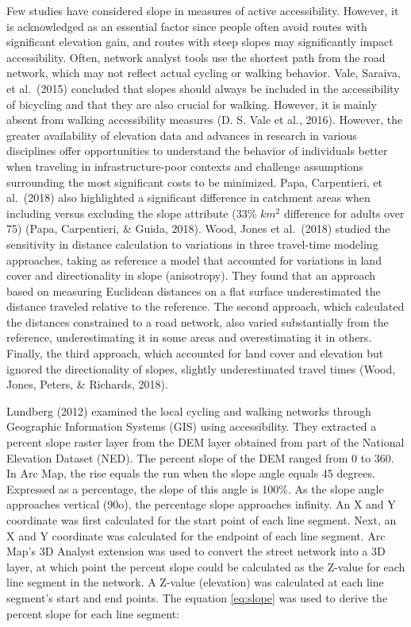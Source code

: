\documentclass[
11pt, %
oneside, %
english, %
singlespacing, %
]{macthesis} %
\begin{document}
Few studies have considered slope in measures of active accessibility. However, it is acknowledged as an essential factor since people often avoid routes with significant elevation gain, and routes with steep slopes may significantly impact accessibility. Often, network analyst tools use the shortest path from the road network, which may not reflect actual cycling or walking behavior. Vale, Saraiva, et al.~(2015) concluded that slopes should always be included in the accessibility of bicycling and that they are also crucial for walking. However, it is mainly absent from walking accessibility measures (D. S. Vale et al., 2016). However, the greater availability of elevation data and advances in research in various disciplines offer opportunities to understand the behavior of individuals better when traveling in infrastructure-poor contexts and challenge assumptions surrounding the most significant costs to be minimized. Papa, Carpentieri, et al.~(2018) also highlighted a significant difference in catchment areas when including versus excluding the slope attribute (33\% \(km^2\) difference for adults over 75) (Papa, Carpentieri, \& Guida, 2018). Wood, Jones et al.~(2018) studied the sensitivity in distance calculation to variations in three travel-time modeling approaches, taking as reference a model that accounted for variations in land cover and directionality in slope (anisotropy). They found that an approach based on measuring Euclidean distances on a flat surface underestimated the distance traveled relative to the reference. The second approach, which calculated the distances constrained to a road network, also varied substantially from the reference, underestimating it in some areas and overestimating it in others. Finally, the third approach, which accounted for land cover and elevation but ignored the directionality of slopes, slightly underestimated travel times (Wood, Jones, Peters, \& Richards, 2018).

Lundberg (2012) examined the local cycling and walking networks through Geographic Information Systems (GIS) using accessibility. They extracted a percent slope raster layer from the DEM layer obtained from part of the National Elevation Dataset (NED). The percent slope of the DEM ranged from 0 to 360. In Arc Map, the rise equals the run when the slope angle equals 45 degrees. Expressed as a percentage, the slope of this angle is 100\%. As the slope angle approaches vertical (90o), the percentage slope approaches infinity. An X and Y coordinate was first calculated for the start point of each line segment. Next, an X and Y coordinate was calculated for the endpoint of each line segment. Arc Map's 3D Analyst extension was used to convert the street network into a 3D layer, at which point the percent slope could be calculated as the Z-value for each line segment in the network. A Z-value (elevation) was calculated at each line segment's start and end points. The equation \eqref{eq:slope} was used to derive the percent slope for each line segment:
\end{document}
